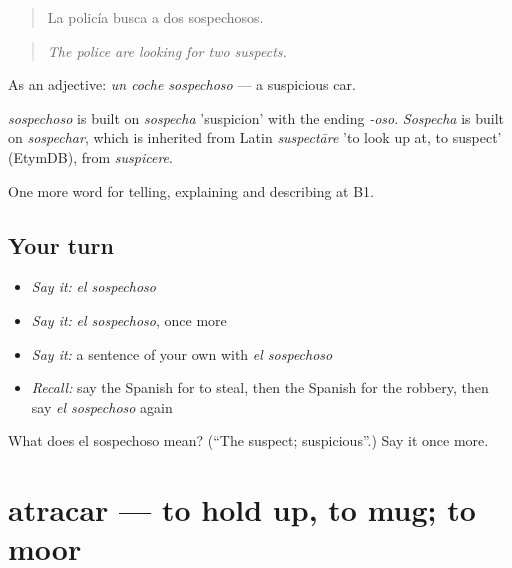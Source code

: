 \begin{quote}
La policía busca a dos sospechosos.
\end{quote}

\begin{quote}
\emph{The police are looking for two suspects.}
\end{quote}

As an adjective: \emph{un coche sospechoso} — a suspicious car.

\begin{cousinweb}
\emph{sospechoso} is built on \emph{sospecha} 'suspicion' with the ending \emph{-oso}. \emph{Sospecha} is built on \emph{sospechar}, which is inherited from Latin \emph{suspectāre} 'to look up at, to suspect' (EtymDB), from \emph{suspicere}.
\end{cousinweb}

\begin{grammarlens}[title={What you've built}]
One more word for telling, explaining and describing at B1.
\end{grammarlens}

\subsection*{Your turn}
\begin{itemize}
\raggedright
  \item \emph{Say it:} \emph{el sospechoso}
  \item \emph{Say it:} \emph{el sospechoso}, once more
  \item \emph{Say it:} a sentence of your own with \emph{el sospechoso}
  \item \emph{Recall:} say the Spanish for to steal, then the Spanish for the robbery, then say \emph{el sospechoso} again
\end{itemize}

\begin{tcolorbox}[breakable,colback=teal!4,colframe=teal!35!black,title={Before you move on}]
What does el sospechoso mean? (\textquotedblleft{}The suspect; suspicious\textquotedblright{}.) Say it once more.
\end{tcolorbox}
\section[atracar]{atracar — to hold up, to mug; to moor}

\label{lesson:ES-C518-atracar}



